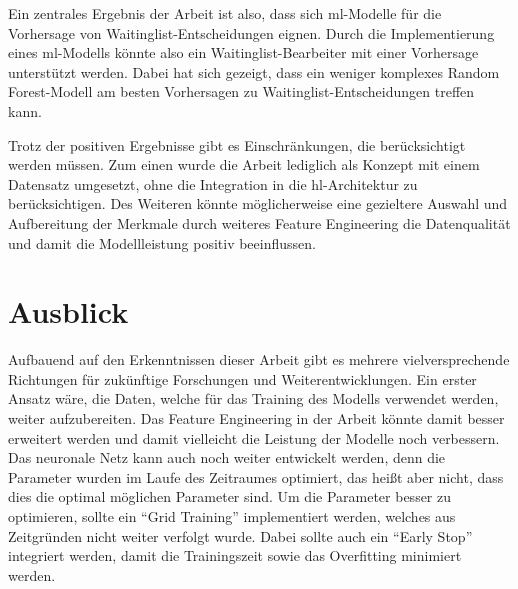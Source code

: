 
Ein zentrales Ergebnis der Arbeit ist also, dass sich \gls{ml}-Modelle für die Vorhersage von Waitinglist-Entscheidungen eignen.
Durch die Implementierung eines \gls{ml}-Modells könnte also ein Waitinglist-Bearbeiter mit einer Vorhersage unterstützt werden.
Dabei hat sich gezeigt, dass ein weniger komplexes Random Forest-Modell am besten Vorhersagen zu Waitinglist-Entscheidungen treffen kann.

Trotz der positiven Ergebnisse gibt es Einschränkungen, die berücksichtigt werden müssen. 
Zum einen wurde die Arbeit lediglich als Konzept mit einem Datensatz umgesetzt, ohne die Integration in die \gls{hl}-Architektur zu berücksichtigen.
Des Weiteren könnte möglicherweise eine gezieltere Auswahl und Aufbereitung der Merkmale durch weiteres Feature Engineering die Datenqualität und damit die Modellleistung positiv beeinflussen.



 

\section{Ausblick}
Aufbauend auf den Erkenntnissen dieser Arbeit gibt es mehrere vielversprechende Richtungen für zukünftige Forschungen und Weiterentwicklungen. Ein erster Ansatz wäre, die Daten, welche für das Training des Modells verwendet werden, weiter aufzubereiten. 
Das Feature Engineering in der Arbeit könnte damit besser erweitert werden und damit vielleicht die Leistung der Modelle noch verbessern.
Das neuronale Netz kann auch noch weiter entwickelt werden, denn die Parameter wurden im Laufe des Zeitraumes optimiert, das heißt aber nicht, dass dies die optimal möglichen Parameter sind. 
Um die Parameter besser zu optimieren, sollte ein \enquote{Grid Training} implementiert werden, welches aus Zeitgründen nicht weiter verfolgt wurde. 
Dabei sollte auch ein \enquote{Early Stop} integriert werden, damit die Trainingszeit sowie das Overfitting minimiert werden.

